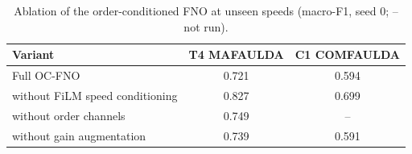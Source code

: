 \begin{table}[t]
\centering
\caption{Ablation of the order-conditioned FNO at unseen speeds (macro-F1, seed 0; -- not run).}
\label{tab:ablation}
\footnotesize
\begin{tabular}{lcc}
\toprule
Variant & T4 MAFAULDA & C1 COMFAULDA \\
\midrule
Full OC-FNO & 0.721 & 0.594 \\
without FiLM speed conditioning & 0.827 & 0.699 \\
without order channels & 0.749 & -- \\
without gain augmentation & 0.739 & 0.591 \\
\bottomrule
\end{tabular}
\end{table}
